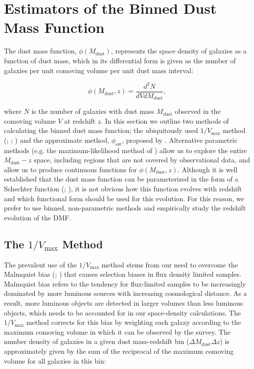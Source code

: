 \section{Estimators of the Binned Dust Mass Function}
\label{sec:dmf_estimators}

The dust mass function, $\phi(M_{\textrm{dust}})$, represents the space density of galaxies as a function of dust mass, which in its differential form is given as the number of galaxies per unit comoving volume per unit dust mass interval:

\begin{equation}
    \phi(M_{\textrm{dust}}, z) = \frac{d^2N}{dV dM_{\textrm{dust}}},
\label{eq:differential_phi}
\end{equation}

\noindent where $N$ is the number of galaxies with dust mass $M_{\textrm{dust}}$ observed in the comoving volume $V$ at redshift $z$. In this section we outline two methods of calculating the binned dust mass function; the ubiquitously used $1/V_{\textrm{max}}$ method (\citealt{Schmidt_1968}; \citealt{Felten_1976}; \citealt{Avni_1980}) and the approximate method, $\phi_{\textrm{est}}$, proposed by \citealt{Page_2000}. Alternative parametric methods (e.g. the maximum-likelihood method of \citealt{Marshall_1983}) allow us to explore the entire $M_{\textrm{dust}} - z$ space, including regions that are not covered by observational data, and allow us to produce continuous functions for $\phi(M_{\textrm{dust}}, z)$. Although it is well established that the dust mass function can be parameterized in the form of a Schechter function (\citealt{Press_1974}; \citealt{Schechter_1976}), it is not obvious how this function evolves with redshift and which functional form should be used for this evolution. For this reason, we prefer to use binned, non-parametric methods and empirically study the redshift evolution of the DMF.

\subsection{The $1/V_{\textrm{max}}$ Method}

The prevalent use of the $1/V_{\textrm{max}}$ method stems from our need to overcome the Malmquist bias (\citealt{Eddington_1914}; \citealt{Malmquist_1922}) that causes selection biases in flux density limited samples. Malmquist bias refers to the tendency for flux-limited samples to be increasingly dominated by more luminous sources with increasing cosmological distance. As a result, more luminous objects are detected in larger volumes than less luminous objects, which needs to be accounted for in our space-density calculations. The $1/V_{\textrm{max}}$ method corrects for this bias by weighting each galaxy according to the maximum comoving volume in which it can be observed by the survey. The number density of galaxies in a given dust mass-redshift bin ($\Delta M_{\textrm{dust}} \Delta z$) is approximately given by the sum of the reciprocal of the maximum comoving volume for all galaxies in this bin:

